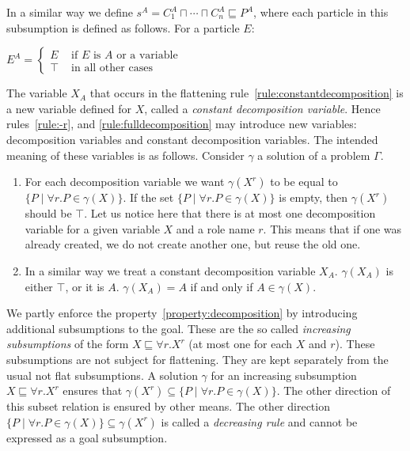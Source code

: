 \documentclass{article}
\begin{document}
In a similar way we define $s^A = C_1^A \sqcap \cdots \sqcap C_n^A \sqsubseteq P^A$, where each particle in this subsumption is defined as follows. For a particle $E$:

	$
E^{A} = \begin{cases}
	E & \text{ if } E \text{ is $A$ or a variable}\\
	\top & \text{ in all other cases } 
\end{cases}
$

The variable $X_A$ that occurs in the flattening rule~\ref{rule:constantdecomposition} is a
new variable defined for $X$, called a \emph{constant decomposition variable}.
Hence rules~\ref{rule:-r}, and \ref{rule:fulldecomposition} may introduce new variables:
decomposition variables and constant decomposition variables.
The intended meaning of these variables is as follows. Consider $\gamma$ a solution of a problem $\Gamma$.

\begin{enumerate}
	\item\label{property:decomposition} For each decomposition variable we want $\gamma(X^r)$ to be equal to $\{P \mid \forall r.P \in \gamma(X)\}$. If the set
	$ \{P \mid \forall r.P \in \gamma(X)\}$ is empty, then $\gamma(X^r)$ should be $\top$.
	Let us notice here that there is at most one decomposition variable for a given variable $X$ and a role name $r$. This means that if one was already created, we do not create another one, but reuse the old one.
	\item\label{property:constantDecomposition} In a similar way we treat a constant decomposition variable $X_A$. $\gamma(X_A)$ is either $\top$,
	or it is $A$. $\gamma(X_A) = A$ if and only if $A \in \gamma(X)$.
\end{enumerate}

We partly enforce the property~\ref{property:decomposition} by introducing additional subsumptions to the goal.
These are the so called  \emph{increasing subsumptions} of the form $X \sqsubseteq \forall r.X^r$ (at most one for each $X$ and $r$). These subsumptions are not subject for flattening. They are kept separately from the usual not flat subsumptions.
A solution $\gamma$ for an increasing subsumption $X \sqsubseteq \forall r.X^r$  ensures that 	$\gamma(X^r) \subseteq \{P \mid \forall r.P \in \gamma(X)\}$. The other direction of this subset relation is ensured by other means.
The other direction $\{P \mid \forall r.P \in \gamma(X)\} \subseteq \gamma(X^r)$ is called a \emph{decreasing rule} and cannot be expressed as a goal subsumption.
\end{document}
